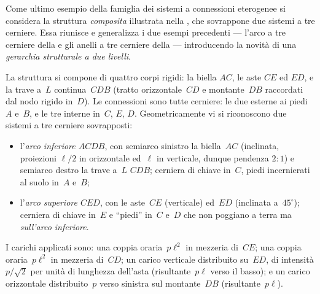 Come ultimo esempio della famiglia dei sistemi a connessioni eterogenee si
considera la struttura \emph{composita} illustrata nella
, che sovrappone due sistemi
a tre cerniere. Essa riunisce e generalizza i due esempi
precedenti --- l'arco a tre cerniere della
 e gli anelli a tre cerniere
della  --- introducendo la
novità di una \emph{gerarchia strutturale a due livelli}.

La struttura si compone di quattro corpi rigidi: la biella
$AC$, le aste $CE$ ed $ED$, e la trave a~$L$ continua~$CDB$
(tratto orizzontale~$CD$ e montante~$DB$ raccordati dal nodo
rigido in~$D$). Le connessioni sono tutte cerniere: le due
esterne ai piedi~$A$ e~$B$, e le tre interne in~$C$, $E$,
$D$. Geometricamente vi si riconoscono due sistemi a tre
cerniere sovrapposti:
\begin{itemize}[noitemsep]
	\item l'\emph{arco inferiore $ACDB$}, con semiarco
	sinistro la biella~$AC$ (inclinata, proiezioni $\ell/2$
	in orizzontale ed~$\ell$ in verticale, dunque pendenza
	$2{:}1$) e semiarco destro la trave a~$L$ $CDB$; cerniera
	di chiave in~$C$, piedi incernierati al suolo in~$A$
	e~$B$;
	\item l'\emph{arco superiore $CED$}, con le aste~$CE$
	(verticale) ed~$ED$ (inclinata a~$45^\circ$); cerniera di
	chiave in~$E$ e ``piedi'' in~$C$ e~$D$ che non poggiano a
	terra ma \emph{sull'arco inferiore}.
\end{itemize}

I carichi applicati sono: una coppia oraria~$p\ell^2$ in
mezzeria di~$CE$; una coppia oraria~$p\ell^2$ in mezzeria
di~$CD$; un carico verticale distribuito su~$ED$, di
intensità $p/\!\sqrt2$ per unità di lunghezza dell'asta
(risultante~$p\ell$ verso il basso); e un carico orizzontale
distribuito~$p$ verso sinistra sul montante~$DB$
(risultante~$p\ell$).

